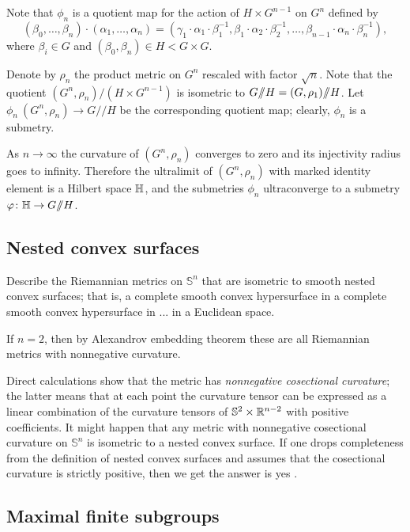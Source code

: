 Note that $\phi_n$ is a quotient map for the action of $H\times G^{n-1}$ on $G^n$ defined by
\[(\beta_0,\dots,\beta_n)\cdot(\alpha_1,\dots,\alpha_n)=(\gamma_1\cdot \alpha_1\cdot\beta_1^{-1},\beta_1\cdot\alpha_2\cdot\beta_2^{-1},\dots,\beta_{n-1}\cdot\alpha_n\cdot\beta_n^{-1}),\]
where $\beta_i\in G$ and $(\beta_0,\beta_n)\in H<G\times G$.

Denote by $\rho_n$ the product metric on $G^n$ rescaled with factor $\sqrt{n}$.
Note that the quotient $(G^n,\rho_n)/(H\times G^{n-1})$ is isometric to $G/\!\!/H\z=(G,\rho_1)/\!\!/H$.
Let $\phi_n\:(G^n,\rho_n)\to G/\!\!/H$ be the corresponding quotient map; 
clearly, $\phi_n$ is a submetry. 

As $n\to\infty$ the curvature of $(G^n,\rho_n)$ converges to zero and its injectivity radius goes to infinity.
Therefore the ultralimit of $(G^n,\rho_n)$ with marked identity element is a Hilbert space $\mathbb{H}$, and the submetries $\phi_n$ ultraconverge to a submetry $\varphi\colon\mathbb{H}\to G/\!\!/H$.


\subsection*{Nested convex surfaces}

\begin{pr}
Describe the Riemannian metrics on $\mathbb{S}^n$ that are isometric to smooth nested convex surfaces;
that is, a complete smooth convex hypersurface in a complete smooth convex hypersurface in ... in a Euclidean space.
\end{pr}

If $n=2$, then by Alexandrov embedding theorem these are all Riemannian metrics with nonnegative curvature.

Direct calculations show that the metric has \emph{nonnegative cosectional curvature};
the latter means that at each point the curvature tensor can be expressed as a linear combination of the curvature tensors of $\mathbb{S}^2\times \mathbb{R}^{n-2}$ with positive coefficients.
It might happen that any metric with nonnegative cosectional curvature on $\mathbb{S}^n$ is isometric to a nested convex surface.
If one drops completeness from the definition of nested convex surfaces
and assumes that the cosectional curvature is strictly positive,
then we get the answer is yes \cite{petrunin-poly}.

\subsection*{Maximal finite subgroups}

